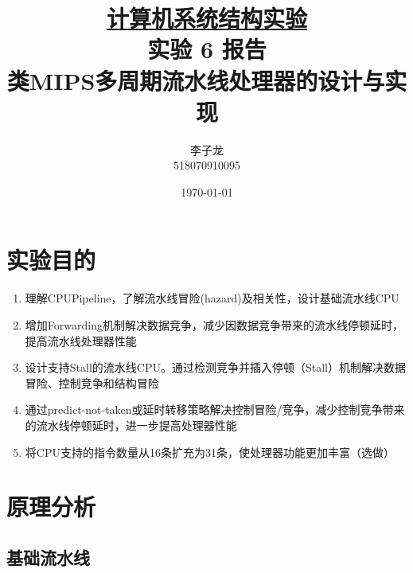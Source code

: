 \documentclass[a4paper,UTF8]{ctexart}
\begin{document}
\title{\normalsize \underline{计算机系统结构实验}\\\LARGE 实验 6 报告\\\vspace*{1em}\normalsize 类MIPS多周期流水线处理器的设计与实现}
\author{李子龙\\ 518070910095}
\date{\today}
\maketitle
\tableofcontents
\clearpage

\section{实验目的}

\begin{enumerate}
    \item 理解CPUPipeline，了解流水线冒险(hazard)及相关性，设计基础流水线CPU
    \item 增加Forwarding机制解决数据竞争，减少因数据竞争带来的流水线停顿延时，提高流水线处理器性能
    \item 设计支持Stall的流水线CPU。通过检测竞争并插入停顿（Stall）机制解决数据冒险、控制竞争和结构冒险
    \item 通过predict-not-taken或延时转移策略解决控制冒险/竞争，减少控制竞争带来的流水线停顿延时，进一步提高处理器性能
    \item 将CPU支持的指令数量从16条扩充为31条，使处理器功能更加丰富（选做）
\end{enumerate}

\section{原理分析}

\subsection{基础流水线}
\end{document}
